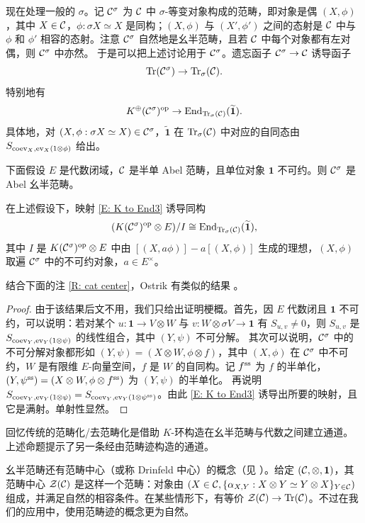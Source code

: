 现在处理一般的 $\sigma$。记 ${\mathcal C}^\sigma$ 为 ${\mathcal C}$ 中 $\sigma$-等变对象构成的范畴，即对象是偶 $(X,\phi)$，其中 $X\in{\mathcal C}$，$\phi: \sigma X\simeq X$ 是同构；$(X,\phi)$ 与 $(X',\phi')$ 之间的态射是 ${\mathcal C}$ 中与 $\phi$ 和 $\phi'$ 相容的态射。注意 ${\mathcal C}^\sigma$ 自然地是幺半范畴，且若 ${\mathcal C}$ 中每个对象都有左对偶，则 ${\mathcal C}^\sigma$ 中亦然。
于是可以把上述讨论用于 ${\mathcal C}^\sigma$。遗忘函子 ${\mathcal C}^\sigma\to{\mathcal C}$ 诱导函子
\[{\operatorname{Tr}}({\mathcal C}^\sigma)\to {\operatorname{Tr}}_\sigma({\mathcal C}).\]
特别地有
\begin{equation}
\label{E: K to End3}
K^{\oplus}({\mathcal C}^\sigma)^{\operatorname{op}}\to {\operatorname{End}}_{{\operatorname{Tr}}_\sigma({\mathcal C})}(\widetilde{\mathbf 1}).
\end{equation}
具体地，对 $(X,\phi: \sigma X\simeq X)\in{\mathcal C}^\sigma$，$\widetilde{\mathbf 1}$ 在 ${\operatorname{Tr}}_\sigma({\mathcal C})$ 中对应的自同态由 $S_{\operatorname{coev}_X, \operatorname{ev}_X(1\otimes\phi)}$ 给出。

下面假设 $E$ 是代数闭域，${\mathcal C}$ 是半单 Abel 范畴，且单位对象 $\mathbf{1}$ 不可约。则 ${\mathcal C}^\sigma$ 是 Abel 幺半范畴。

\begin{prop}
\label{L: K iso End}
在上述假设下，映射 \eqref{E: K to End3} 诱导同构
\[
(K({\mathcal C}^\sigma)^{\operatorname{op}}\otimes E)/I\cong {\operatorname{End}}_{{\operatorname{Tr}}_\sigma({\mathcal C})}(\widetilde{\mathbf 1}),
\]
其中 $I$ 是 $K({\mathcal C}^\sigma)^{\operatorname{op}}\otimes E$ 中由 $[(X,a\phi)]-a[(X,\phi)]$ 生成的理想，$(X,\phi)$ 取遍 ${\mathcal C}^\sigma$ 中的不可约对象，$a\in E^\times$。
\end{prop}
结合下面的注 \ref{R: cat center}，Ostrik 有类似的结果 \cite[推论 2.16]{O}。
\begin{proof}
由于该结果后文不用，我们只给出证明梗概。首先，因 $E$ 代数闭且 $\mathbf{1}$ 不可约，可以说明：若对某个 $u:\mathbf{1}\to V\otimes W$ 与 $v: W\otimes \sigma V\to \mathbf{1}$ 有 $S_{u,v}\neq 0$，则 $S_{u,v}$ 是 $S_{\operatorname{coev}_{Y}, \operatorname{ev}_Y(1\otimes\psi)}$ 的线性组合，其中 $(Y,\psi)$ 不可分解。
其次可以说明，${\mathcal C}^\sigma$ 中的不可分解对象都形如 $(Y,\psi)=(X\otimes W, \phi\otimes f)$，其中 $(X,\phi)$ 在 ${\mathcal C}^\sigma$ 中不可约，$W$ 是有限维 $E$-向量空间，$f$ 是 $W$ 的自同构。记 $f^{\operatorname{ss}}$ 为 $f$ 的半单化，$(Y,\psi^{\operatorname{ss}})=(X\otimes W,\phi\otimes f^{\operatorname{ss}})$ 为 $(Y,\psi)$ 的半单化。
再说明 $S_{\operatorname{coev}_{Y}, \operatorname{ev}_Y(1\otimes\psi)}=S_{\operatorname{coev}_{Y},\operatorname{ev}_Y(1\otimes\psi^{\operatorname{ss}})}$。由此 \eqref{E: K to End3} 诱导出所要的映射，且它是满射。单射性显然。
\end{proof}

\begin{rmk}回忆传统的范畴化/去范畴化是借助 $K$-环构造在幺半范畴与代数之间建立通道。上述命题提示了另一条经由范畴迹构造的通道。
\end{rmk}

\begin{rmk}
\label{R: cat center}
幺半范畴还有范畴中心（或称 Drinfeld 中心）的概念（见 \cite{BFO, BN, Lu3}）。给定 $({\mathcal C},\otimes,\mathbf{1})$，其范畴中心 ${\mathcal Z}({\mathcal C})$ 是这样一个范畴：对象由 $(X\in {\mathcal C}, \{{\alpha}_{X,Y}: X\otimes Y\simeq Y\otimes X\}_{Y\in {\mathcal C}})$ 组成，并满足自然的相容条件。在某些情形下，有等价 ${\mathcal Z}({\mathcal C})\to {\operatorname{Tr}}({\mathcal C})$。不过在我们的应用中，使用范畴迹的概念更为自然。
\end{rmk}
